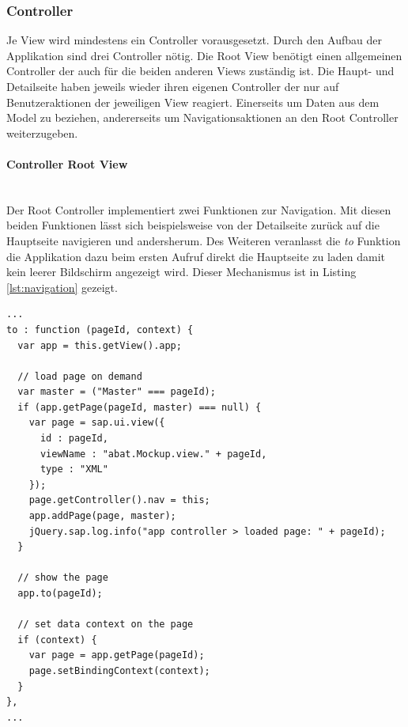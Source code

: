 \subsubsection{Controller}
Je View wird mindestens ein Controller vorausgesetzt. Durch den Aufbau der Applikation sind drei Controller nötig. Die Root View benötigt einen allgemeinen Controller der auch für die beiden anderen Views zuständig ist. Die Haupt- und Detailseite haben jeweils wieder ihren eigenen Controller der nur auf Benutzeraktionen der jeweiligen View reagiert. Einerseits um Daten aus dem Model zu beziehen, andererseits um Navigationsaktionen an den Root Controller weiterzugeben.

\paragraph{Controller Root View}$\;$ \\
Der Root Controller implementiert zwei Funktionen zur Navigation. Mit diesen beiden Funktionen lässt sich beispielsweise von der Detailseite zurück auf die Hauptseite navigieren und andersherum. Des Weiteren veranlasst die \textit{to} Funktion die Applikation dazu beim ersten Aufruf direkt die Hauptseite zu laden damit kein leerer Bildschirm angezeigt wird. Dieser Mechanismus ist in Listing \ref{lst:navigation} gezeigt.

\vspace{1em}
\begin{lstlisting}[frame=htrbl, caption=Navigationsmechanismus, label=lst:navigation]
...
to : function (pageId, context) {
  var app = this.getView().app;

  // load page on demand
  var master = ("Master" === pageId);
  if (app.getPage(pageId, master) === null) {
    var page = sap.ui.view({
      id : pageId,
      viewName : "abat.Mockup.view." + pageId,
      type : "XML"
    });
	page.getController().nav = this;
	app.addPage(page, master);
	jQuery.sap.log.info("app controller > loaded page: " + pageId);
  }

  // show the page
  app.to(pageId);

  // set data context on the page
  if (context) {
    var page = app.getPage(pageId);
    page.setBindingContext(context);
  }
},
...
\end{lstlisting}

